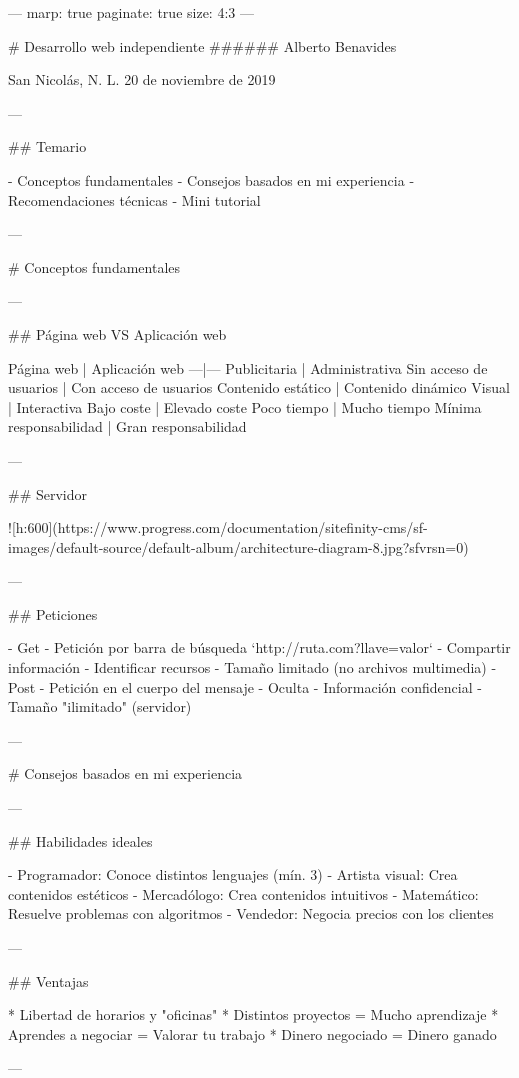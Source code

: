 ---
marp: true
paginate: true
size: 4:3
---

# Desarrollo web independiente
###### Alberto Benavides


San Nicolás, N. L. 
20 de noviembre de 2019    

---

## Temario

- Conceptos fundamentales
- Consejos basados en mi experiencia
- Recomendaciones técnicas
- Mini tutorial

---

# Conceptos fundamentales

---

## Página web VS Aplicación web

Página web | Aplicación web
---|---
Publicitaria | Administrativa
Sin acceso de usuarios | Con acceso de usuarios
Contenido estático | Contenido dinámico
Visual | Interactiva
Bajo coste | Elevado coste
Poco tiempo | Mucho tiempo
Mínima responsabilidad | Gran responsabilidad

---

## Servidor

![h:600](https://www.progress.com/documentation/sitefinity-cms/sf-images/default-source/default-album/architecture-diagram-8.jpg?sfvrsn=0)

---

## Peticiones

- Get
	- Petición por barra de búsqueda
	`http://ruta.com?llave=valor`
	- Compartir información
	- Identificar recursos
	- Tamaño limitado (no archivos multimedia)
- Post
	- Petición en el cuerpo del mensaje
	- Oculta
	- Información confidencial
	- Tamaño "ilimitado" (servidor)

---

# Consejos basados en mi experiencia

---

## Habilidades ideales

- Programador: Conoce distintos lenguajes (mín. 3)
- Artista visual: Crea contenidos estéticos
- Mercadólogo: Crea contenidos intuitivos
- Matemático: Resuelve problemas con  algoritmos
- Vendedor: Negocia precios con los clientes

---

## Ventajas

* Libertad de horarios y "oficinas"
* Distintos proyectos = Mucho aprendizaje
* Aprendes a negociar = Valorar tu trabajo
* Dinero negociado = Dinero ganado

---

